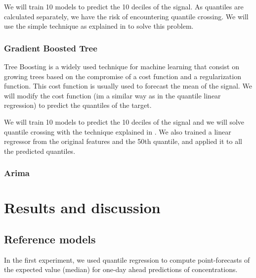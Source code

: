 \documentclass[a4paper,twocolumn,5p]{elsarticle}
\begin{document}
We will train 10 models to predict the 10 deciles of the signal. As quantiles are 
calculated separately, we have the risk of encountering quantile crossing.
We will use the simple technique as explained in \cite{cross} to solve this problem.

\subsubsection{Gradient Boosted Tree}

Tree Boosting \cite{gradientboost} is a widely used technique for machine learning 
that consist on growing trees based on the compromise 
of a cost function and a regularization function. This cost function is usually 
used to forecast 
the mean of the signal. We will modify the cost function (im a similar way as in 
the quantile linear regression) to predict the quantiles of the target. 

We will train 10 models to predict the 10 deciles of the signal and we will solve 
 quantile crossing with the technique explained in \cite{cross}. We also trained a 
 linear regressor from the original features and the 50th quantile, 
and applied it to all the predicted quantiles. 

\subsubsection{Arima}

\section{Results and discussion}
\label{sec:results}

\subsection{Reference models}
\label{sec:deterministic}

In the first experiment, we used quantile regression to compute
point-forecasts of the expected value (median) for one-day ahead
predictions of \no concentrations.
\end{document}
